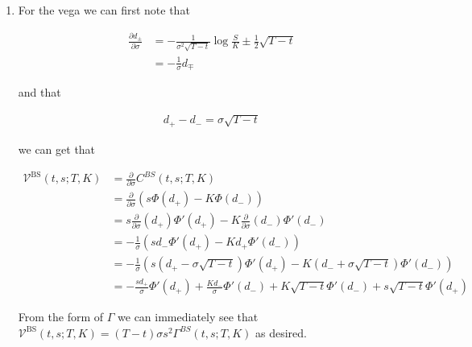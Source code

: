 \documentclass[12pt]{book}
\numberwithin{equation}{chapter}
\theoremstyle{plain}
\numberwithin{theorem}{section}
\theoremstyle{definition}
\numberwithin{exercise}{chapter}
\newcommand{\<}{\langle}
\renewcommand{\>}{\rangle}
\renewcommand{\(}{\left(}
\renewcommand{\)}{\right)}
\renewcommand{\[}{\left[}
\renewcommand{\]}{\right]}
\newcommand\Vc{\mathscr{V}}
\renewcommand\d{\partial}
\newcommand\BS{\textrm{BS}}
\theoremstyle{definition}
\numberwithin{question}{section}
\begin{document}
\begin{enumerate}
    
    \item For the vega we can first note that
    
    \begin{align*}
        \frac{\d d_{\pm}}{ \d \sigma} & = - \frac{1}{\sigma^2\sqrt{T-t}} \log \frac{S}{K} \pm \frac{1}{2}\sqrt{T-t} \\
        {} & = -\frac{1}{\sigma} d_{\mp}
    \end{align*}
    
    and that
    
    \begin{align*}
        d_+ - d_- = \sigma \sqrt{T-t} 
    \end{align*}
    
    we can get that
    
    \begin{align}
        \Vc^\BS(t,s;T,K) & = \frac{\d}{\d \sigma} C^{BS}(t,s;T,K) \\
        {} & = \frac{\d }{\d \sigma} (s \Phi ( d_+ ) - K \Phi( d_- )) \\
        {} & = s \frac{\d}{\d \sigma}(d_+)\Phi'(d_{+}) - K \frac{\d}{\d \sigma}(d_-)\Phi'(d_{-}) \\
        {} & = -\frac{1}{\sigma} (s d_- \Phi'(d_+) - Kd_+ \Phi'(d_-)) \\
        {} & = -\frac{1}{\sigma} (s (d_+ - \sigma \sqrt{T-t}) \Phi'(d_+) - K (d_- + \sigma\sqrt{T-t}) \Phi'(d_-)) \\
        {} & = -\frac{sd_+}{\sigma}\Phi'(d_+) +  \frac{Kd_-}{\sigma} \Phi'(d_-) + K\sqrt{T-t}\Phi'(d_-)+s\sqrt{T-t}\Phi'(d_+)
    \end{align}
    
    From the form of $\Gamma$ we can immediately see that $ \Vc^\BS(t,s;T,K) = (T-t)\sigma s^2 \Gamma^{BS}(t,s;T,K)$ as desired.
    
\end{enumerate}


\end{document}
